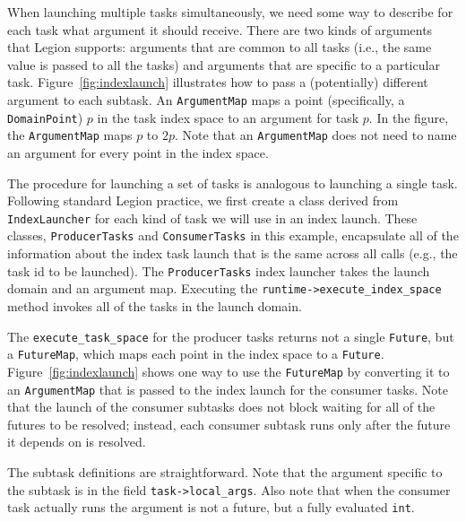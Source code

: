 When launching multiple tasks simultaneously, we need some way to
describe for each task what argument it should receive.  There are two
kinds of arguments that Legion supports: arguments that are common to
all tasks (i.e., the same value is passed to all the tasks) and
arguments that are specific to a particular task.
Figure~\ref{fig:indexlaunch} illustrates how to pass a (potentially)
different argument to each subtask.  An {\tt ArgumentMap} maps a point
(specifically, a {\tt DomainPoint}) $p$ in the task index space to an
argument for task $p$. In the figure, the {\tt ArgumentMap} maps $p$
to $2p$.  Note that an {\tt ArgumentMap} does not need to name an argument
for every point in the index space.

The procedure for launching a set of tasks is analogous to launching a
single task.  Following standard Legion practice, we first create a
class derived from {\tt IndexLauncher} for each kind of task we will use in an
index launch. These classes, {\tt ProducerTasks} and {\tt ConsumerTasks} in this
example, encapsulate all of the information about the index task launch that is the
same across all calls (e.g., the task id to be launched).  The {\tt ProducerTasks}
index launcher takes the launch domain and an argument map.
Executing the {\tt runtime->execute\_index\_space} method invokes all of the tasks
in the launch domain. 

The {\tt execute\_task\_space} for the producer tasks returns not
a single {\tt Future}, but a {\tt FutureMap}, which maps each point in the index
space to a {\tt Future}.  Figure~\ref{fig:indexlaunch} shows one way to
use the {\tt FutureMap} by converting it to an {\tt ArgumentMap} that is passed to
the index launch for the consumer tasks.  Note that the launch of the consumer subtasks
does not block waiting for all of the futures to be resolved; instead, each consumer subtask
runs only after the future it depends on is resolved.

The subtask definitions are straightforward.  Note that the argument specific to the subtask is
in the field {\tt task->local\_args}.  Also note that when the consumer task actually runs 
the argument is not a future, but a fully evaluated {\tt int}.


